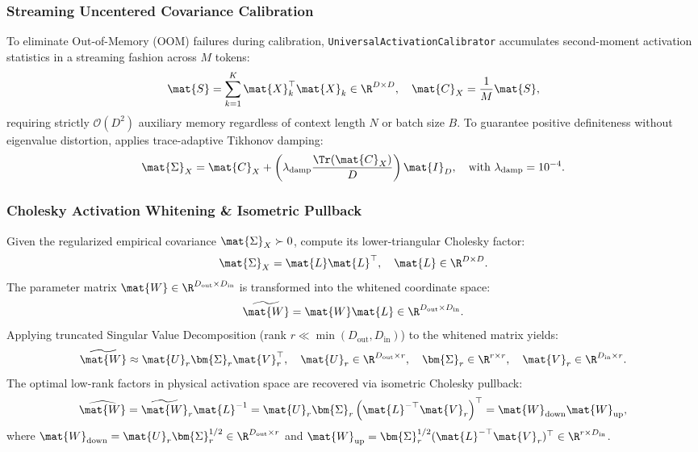 \subsubsection{Streaming Uncentered Covariance Calibration}
To eliminate Out-of-Memory (OOM) failures during calibration, \texttt{UniversalActivationCalibrator} accumulates second-moment activation statistics in a streaming fashion across $M$ tokens:
\begin{equation}
\label{eq:streaming_gram}
\mat{S} = \sum_{k=1}^K \mat{X}_k^\top \mat{X}_k \in \R^{D \times D}, \quad \mat{C}_X = \frac{1}{M} \mat{S},
\end{equation}
requiring strictly $\mathcal{O}(D^2)$ auxiliary memory regardless of context length $N$ or batch size $B$. To guarantee positive definiteness without eigenvalue distortion, \neuralops{} applies trace-adaptive Tikhonov damping:
\begin{equation}
\label{eq:adaptive_damping}
\mat{\Sigma}_X = \mat{C}_X + \left( \lambda_{\text{damp}} \frac{\Tr(\mat{C}_X)}{D} \right) \mat{I}_D, \quad \text{with } \lambda_{\text{damp}} = 10^{-4}.
\end{equation}

\subsubsection{Cholesky Activation Whitening \& Isometric Pullback}
Given the regularized empirical covariance $\mat{\Sigma}_X \succ 0$, compute its lower-triangular Cholesky factor:
\begin{equation}
\label{eq:cholesky_factor}
\mat{\Sigma}_X = \mat{L} \mat{L}^\top, \quad \mat{L} \in \R^{D \times D}.
\end{equation}
The parameter matrix $\mat{W} \in \R^{D_{\text{out}} \times D_{\text{in}}}$ is transformed into the whitened coordinate space:
\begin{equation}
\widetilde{\mat{W}} = \mat{W} \mat{L} \in \R^{D_{\text{out}} \times D_{\text{in}}}.
\end{equation}
Applying truncated Singular Value Decomposition (rank $r \ll \min(D_{\text{out}}, D_{\text{in}})$) to the whitened matrix yields:
\begin{equation}
\widetilde{\mat{W}} \approx \mat{U}_r \bm{\Sigma}_r \mat{V}_r^\top, \quad \mat{U}_r \in \R^{D_{\text{out}} \times r}, \quad \bm{\Sigma}_r \in \R^{r \times r}, \quad \mat{V}_r \in \R^{D_{\text{in}} \times r}.
\end{equation}
The optimal low-rank factors in physical activation space are recovered via isometric Cholesky pullback:
\begin{equation}
\label{eq:cholesky_pullback}
\widehat{\mat{W}} = \widetilde{\mat{W}}_r \mat{L}^{-1} = \mat{U}_r \bm{\Sigma}_r \left( \mat{L}^{-\top} \mat{V}_r \right)^\top = \mat{W}_{\text{down}} \mat{W}_{\text{up}},
\end{equation}
where $\mat{W}_{\text{down}} = \mat{U}_r \bm{\Sigma}_r^{1/2} \in \R^{D_{\text{out}} \times r}$ and $\mat{W}_{\text{up}} = \bm{\Sigma}_r^{1/2} (\mat{L}^{-\top} \mat{V}_r)^\top \in \R^{r \times D_{\text{in}}}$.

